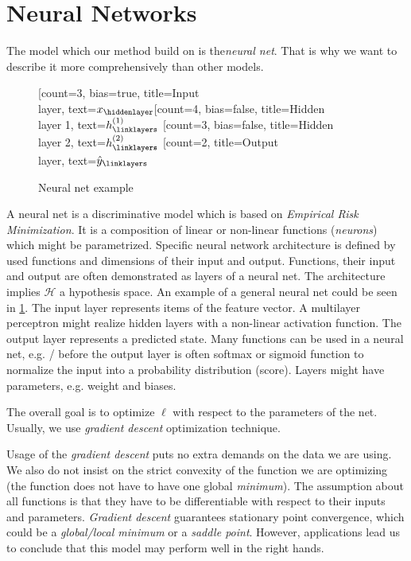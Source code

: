 \section{Neural Networks}
The model which our method build on is the\emph{neural net}. That is why we want to describe it more comprehensively than other models.
\begin{figure}
    \centering
    \begin{neuralnetwork}[height=4]
        \newcommand{\x}[2]{$x_#2$}
        \newcommand{\y}[2]{$\hat{y}_#2$}
        \newcommand{\hfirst}[2]{\small $h^{(1)}_#2$}
        \newcommand{\hsecond}[2]{\small $h^{(2)}_#2$}
        [count=3, bias=true, title=Input\\layer, text=\x]
        \hiddenlayer[count=4, bias=false, title=Hidden\\layer 1, text=\hfirst] \linklayers
        \hiddenlayer[count=3, bias=false, title=Hidden\\layer 2, text=\hsecond] \linklayers
        \outputlayer[count=2, title=Output\\layer, text=\y] \linklayers
    \end{neuralnetwork}
    \caption{Neural net example}
    \label{fig:neuralnet}
\end{figure}

A neural net is a discriminative model which is based on \emph{Empirical Risk Minimization}. It is a composition of linear or non-linear functions (\emph{neurons}) which might be parametrized. Specific neural network architecture is defined by used functions and dimensions of their input and output. Functions, their input and output are often demonstrated as layers of a neural net. The architecture implies $\mathcal{H}$ a hypothesis space. An example of a general neural net could be seen in \ref{fig:neuralnet}. The input layer represents items of the feature vector. A multilayer perceptron might realize hidden layers with a non-linear activation function. The output layer represents a predicted state. Many functions can be used in a neural net, e.g. / before the output layer is often softmax or sigmoid function to normalize the input into a probability distribution (score). Layers might have parameters, e.g. weight and biases.

The overall goal is to optimize $\ell$ with respect to the parameters of the net. Usually, we use \emph{gradient descent} optimization technique.

Usage of the \emph{gradient descent} puts no extra demands on the data we are using. We also do not insist on the strict convexity of the function we are optimizing (the function does not have to have one global \emph{minimum}). The assumption about all functions is that they have to be differentiable with respect to their inputs and parameters. \emph{Gradient descent} guarantees stationary point convergence, which could be a \emph{global/local minimum} or a \emph{saddle point}. However, applications lead us to conclude that this model may perform well in the right hands.

